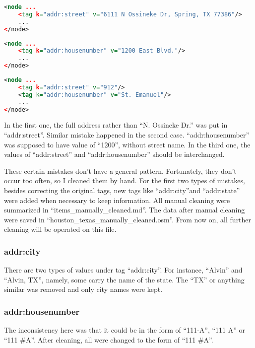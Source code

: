\documentclass[12pt]{article}
\begin{document}
\begin{lstlisting}[language=XML,breaklines=tr, frame=single, basicstyle=\small]
<node ...
    <tag k="addr:street" v="6111 N Ossineke Dr, Spring, TX 77386"/>
    ...
</node>
\end{lstlisting}

\begin{lstlisting}[language=XML,breaklines=tr, frame=single, basicstyle=\small]
<node ...
    <tag k="addr:housenumber" v="1200 East Blvd."/>
    ...
</node>
\end{lstlisting}

\begin{lstlisting}[language=XML,breaklines=tr, frame=single, basicstyle=\small]
<node ...
    <tag k="addr:street" v="912"/>
    <tag k="addr:housenumber" v="St. Emanuel"/>
    ...
</node>
\end{lstlisting}

In the first one, the full address rather than ``N. Ossineke Dr.'' was put in ``addr:street''. Similar mistake happened in the second case. ``addr:housenumber'' was supposed to have value of ``1200'', without street name. In the third one, the values of ``addr:street'' and ``addr:housenumber'' should be interchanged.

These certain mistakes don't have a general pattern. Fortunately, they don't occur too often, so I cleaned them by hand. For the first two types of mistakes, besides correcting the original tags, new tags like ``addr:city''and ``addr:state'' were added when necessary to keep information. All manual cleaning were summarized in ``items\_manually\_cleaned.md''. The data after manual cleaning were saved in ``houston\_texas\_manually\_cleaned.osm''. From now on, all further cleaning will be operated on this file.

\subsubsection{addr:city}
There are two types of values under tag ``addr:city''. For instance, ``Alvin'' and ``Alvin, TX'', namely, some carry the name of the state. The ``TX'' or anything similar was removed and only city names were kept.

\subsubsection{addr:housenumber}
The inconsistency here was that it could be in the form of ``111-A'', ``111 A'' or ``111 \#A''. After cleaning, all were changed to the form of ``111 \#A''.
\end{document}
